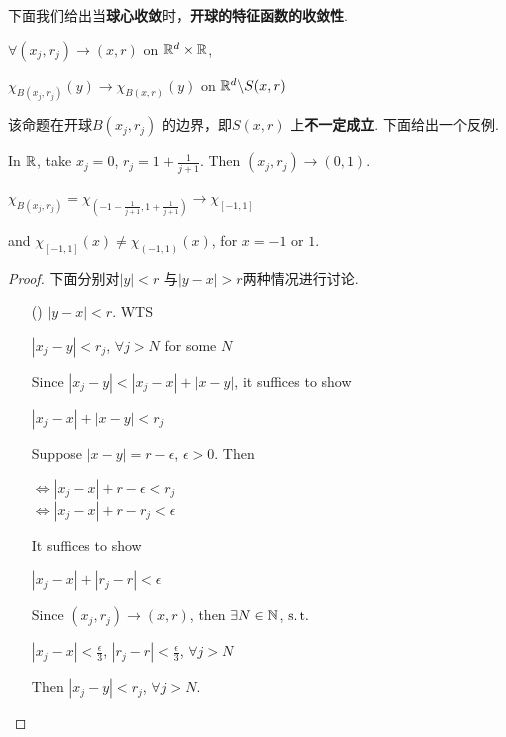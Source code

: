 	\newpage
	下面我们给出当\textbf{球心收敛}时，\textbf{开球的特征函数的收敛性}.
	\begin{proposition}\label{prop 4.3.2}
		$\forall (x_j , r_j) \to (x , r)$ on $\mathbb{R}^d \times \mathbb{R}$,
		\begin{center}
			$\chi_{B(x_j , r_j)}(y) \to \chi_{B(x , r)}(y)$ on $\mathbb{R}^d \backslash S(x , r)$
		\end{center}
	
		\vspace{1em}
		\begin{rmk}
			该命题在开球$B(x_j , r_j)$ 的边界，即$S(x , r)$ 上\textbf{不一定成立}. 下面给出一个反例.
			\begin{example}\label{ex 4.3.1}
				In $\mathbb{R}$, take $x_j = 0$, $r_j = 1 + \frac{1}{j + 1}$. Then $(x_j , r_j) \to (0 , 1)$.
				\begin{center}
					$\chi_{B(x_j , r_j)} 
					= \chi_{(-1 - \frac{1}{j + 1} , 1 + \frac{1}{j + 1})} 
					\to \chi_{[-1 , 1]}$
				\end{center}
				and $\chi_{[-1 , 1]}(x) \neq \chi_{(-1 , 1)}(x)$, for $x = -1$ or $1$.
			\end{example}
		\end{rmk}
	
		\vspace{2em}
		\begin{proof}
			下面分别对$\left| y \right| < r$ 与$\left| y - x \right| > r$两种情况进行讨论.
			\begin{enumerate}
				\item[(\rmnum{1})]$\left| y - x \right| < r$. WTS
				\begin{center}
					$\left| x_j - y \right| < r_j$, $\forall j > N$ for some $N$
				\end{center}
				Since $\left| x_j - y \right| < \left| x_j - x \right| + \left| x - y \right|$, it suffices to show
				\begin{center}
					$\left| x_j - x \right| + \left| x - y \right| < r_j$
				\end{center}
				Suppose $\left| x - y \right| = r - \epsilon$, $\epsilon > 0$. Then 
				\begin{center}
					$\Leftrightarrow \left| x_j - x \right| + r - \epsilon < r_j$ \\
					$\Leftrightarrow \left| x_j - x \right| + r - r_j < \epsilon$
				\end{center}
				It suffices to show
				\begin{center}
					$\left| x_j - x \right| + \left| r_j - r \right| < \epsilon$
				\end{center}
				Since $(x_j , r_j) \to (x , r)$, then $\exists N \in \mathbb{N}$, $\operatorname{s.t.}$
				\begin{center}
					$\left| x_j - x \right| < \frac{\epsilon}{3}$, $\left| r_j - r \right| < \frac{\epsilon}{3}$, $\forall j > N$
				\end{center}
				Then $\left| x_j - y \right| < r_j$, $\forall j > N$.
				

\end{enumerate}
\end{proof}
\end{proposition}
